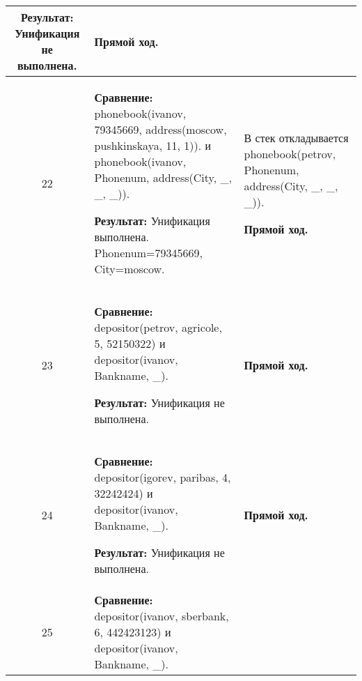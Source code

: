 \begin{longtable}{|c|p{}|p{}|}
    \textbf{Результат:} \newline
    Унификация не выполнена.
                       &
    \textbf{Прямой ход.}
                       \\ \hline

    22
                       &
\textbf{Сравнение:} \newline
  phonebook(ivanov, 79345669,
            address(moscow,    pushkinskaya, 11, 1)).
    \newline и \newline
    phonebook(ivanov, Phonenum, address(City, \_, \_, \_)).
    \newline

    \textbf{Результат:} \newline
    Унификация выполнена.\newline{}
    Phonenum=79345669, City=moscow.
                       &
    В стек откладывается\newline
    phonebook(petrov, Phonenum, address(City, \_, \_, \_)).
    \newline

    \textbf{Прямой ход.}
                       \\ \hline

    23
                       &
\textbf{Сравнение:} \newline
  depositor(petrov, agricole, 5, 52150322)
    \newline и \newline
    depositor(ivanov, Bankname, \_).
    \newline

    \textbf{Результат:} \newline
    Унификация не выполнена.
                       &
    \textbf{Прямой ход.}
                       \\ \hline

    24
                       &
\textbf{Сравнение:} \newline
  depositor(igorev, paribas,  4, 32242424)
    \newline и \newline
    depositor(ivanov, Bankname, \_).
    \newline

    \textbf{Результат:} \newline
    Унификация не выполнена.
                       &
    \textbf{Прямой ход.}
                       \\ \hline

    25
                       &
\textbf{Сравнение:} \newline
  depositor(ivanov, sberbank, 6, 442423123)
    \newline и \newline
    depositor(ivanov, Bankname, \_).
    \newline


\end{longtable}

